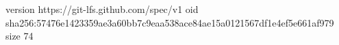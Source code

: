 version https://git-lfs.github.com/spec/v1
oid sha256:57476e1423359ae3a60bb7c9eaa538ace84ae15a0121567df1e4ef5e661af979
size 74
